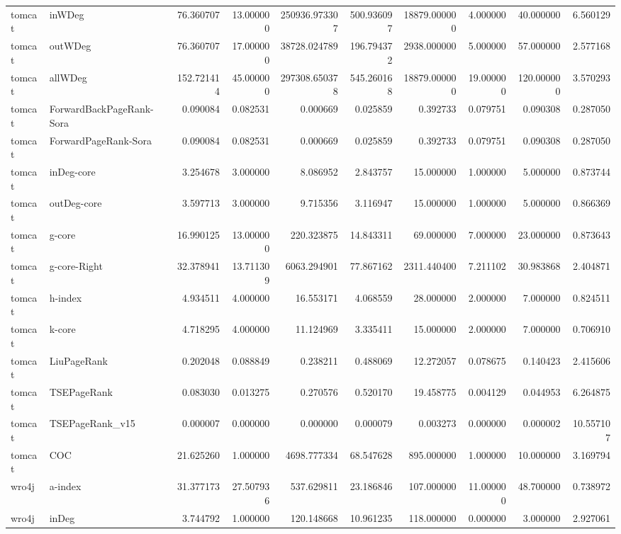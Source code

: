 \begin{tabular}{llrrrrrrrr}
tomcat & inWDeg & 76.360707 & 13.000000 & 250936.973307 & 500.936097 & 18879.000000 & 4.000000 & 40.000000 & 6.560129 \\
tomcat & outWDeg & 76.360707 & 17.000000 & 38728.024789 & 196.794372 & 2938.000000 & 5.000000 & 57.000000 & 2.577168 \\
tomcat & allWDeg & 152.721414 & 45.000000 & 297308.650378 & 545.260168 & 18879.000000 & 19.000000 & 120.000000 & 3.570293 \\
tomcat & ForwardBackPageRank-Sora & 0.090084 & 0.082531 & 0.000669 & 0.025859 & 0.392733 & 0.079751 & 0.090308 & 0.287050 \\
tomcat & ForwardPageRank-Sora & 0.090084 & 0.082531 & 0.000669 & 0.025859 & 0.392733 & 0.079751 & 0.090308 & 0.287050 \\
tomcat & inDeg-core & 3.254678 & 3.000000 & 8.086952 & 2.843757 & 15.000000 & 1.000000 & 5.000000 & 0.873744 \\
tomcat & outDeg-core & 3.597713 & 3.000000 & 9.715356 & 3.116947 & 15.000000 & 1.000000 & 5.000000 & 0.866369 \\
tomcat & g-core & 16.990125 & 13.000000 & 220.323875 & 14.843311 & 69.000000 & 7.000000 & 23.000000 & 0.873643 \\
tomcat & g-core-Right & 32.378941 & 13.711309 & 6063.294901 & 77.867162 & 2311.440400 & 7.211102 & 30.983868 & 2.404871 \\
tomcat & h-index & 4.934511 & 4.000000 & 16.553171 & 4.068559 & 28.000000 & 2.000000 & 7.000000 & 0.824511 \\
tomcat & k-core & 4.718295 & 4.000000 & 11.124969 & 3.335411 & 15.000000 & 2.000000 & 7.000000 & 0.706910 \\
tomcat & LiuPageRank & 0.202048 & 0.088849 & 0.238211 & 0.488069 & 12.272057 & 0.078675 & 0.140423 & 2.415606 \\
tomcat & TSEPageRank & 0.083030 & 0.013275 & 0.270576 & 0.520170 & 19.458775 & 0.004129 & 0.044953 & 6.264875 \\
tomcat & TSEPageRank_v15 & 0.000007 & 0.000000 & 0.000000 & 0.000079 & 0.003273 & 0.000000 & 0.000002 & 10.557107 \\
tomcat & COC & 21.625260 & 1.000000 & 4698.777334 & 68.547628 & 895.000000 & 1.000000 & 10.000000 & 3.169794 \\
wro4j & a-index & 31.377173 & 27.507936 & 537.629811 & 23.186846 & 107.000000 & 11.000000 & 48.700000 & 0.738972 \\
wro4j & inDeg & 3.744792 & 1.000000 & 120.148668 & 10.961235 & 118.000000 & 0.000000 & 3.000000 & 2.927061 \\

\end{tabular}
